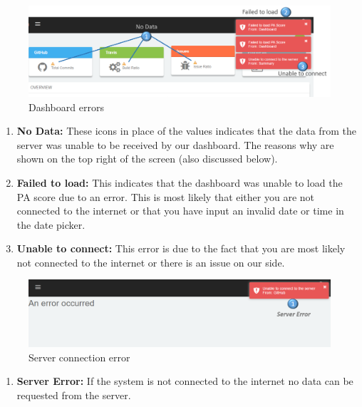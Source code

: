 \documentclass[11pt,a4paper]{article}
\begin{document}
\begin{figure}[H]
	\begin{center}
		\includegraphics[width=\linewidth]{../Images/Getting_Started/Dash_Error_numbered}
		\caption{Dashboard errors}
	\end{center}
\end{figure}

\begin{enumerate}
	\item \textbf{No Data:} These icons in place of the values indicates that the data from the server was unable to be received by our dashboard. The reasons why are shown on the top right of the screen (also discussed below).
	\item \textbf{Failed to load:} This indicates that the dashboard was unable to load the PA score due to an error. This is most likely that either you are not connected to the internet or that you have input an invalid date or time in the date picker. 
	\item \textbf{Unable to connect:} This error is due to the fact that you are most likely not connected to the internet or there is an issue on our side. 
\end{enumerate}
\begin{figure}[H]
	\begin{center}
		\includegraphics[width=\linewidth]{../Images/Getting_Started/Connect_Server_Detailed_numbered}
		\caption{Server connection error}
	\end{center}
\end{figure}

\begin{enumerate}
	\item \textbf{Server Error:} If the system is not connected to the internet no data can be requested from the server.
\end{enumerate}
\end{document}
